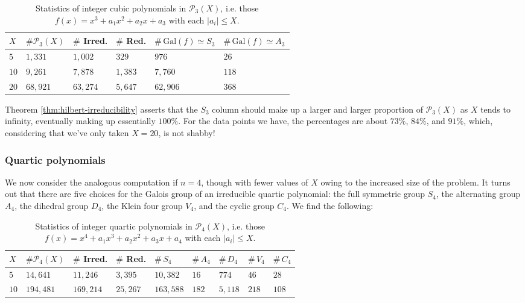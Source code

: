 \documentclass[12pt]{amsart}
\theoremstyle{definition} \newtheorem*{notation}{Notation}
\theoremstyle{remark} \newtheorem*{remark}{Remark}
\numberwithin{equation}{section}
\numberwithin{theorem}{section}
\begin{document}
	\begin{table}[h] \label{tbl:hilbert-cubic}
		\begin{tabular}{|l|l||l|l||l|l|}
			\hline $X$ & $\#\mathcal{P}_3(X)$ & $\#$ Irred. & $\#$ Red. & $\#\,\mathrm{Gal}(f) \simeq S_3$ & $\#\,\mathrm{Gal}(f) \simeq A_3$ \\ \hline
			$5$ & $1{,}331$ & $1{,}002$ & $329$ & $976$ & $26$ \\
			$10$ & $9{,}261$ & $7{,}878$ & $1{,}383$ & $7{,}760$ & $118$ \\
			$20$ & $68{,}921$ & $63{,}274$ & $5{,}647$ & $62{,}906$ & $368$ \\ \hline			
		\end{tabular}
		\caption{
			Statistics of integer cubic polynomials in $\mathcal{P}_3(X)$, i.e. those $f(x) = x^3 + a_1x^2 + a_2x + a_3$ with each $|a_i| \leq X$.
		}
	\end{table}
	
	Theorem \ref{thm:hilbert-irreducibility} asserts that the $S_3$ column should make up a larger and larger proportion of $\mathcal{P}_3(X)$ as $X$ tends to infinity, eventually making up essentially $100\%$.  For the data points we have, the percentages are about $73\%$, $84\%$, and $91\%$, which, considering that we've only taken $X=20$, is not shabby!
	
	\subsubsection{Quartic polynomials}  We now consider the analogous computation if $n=4$, though with fewer values of $X$ owing to the increased size of the problem.  It turns out that there are five choices for the Galois group of an irreducible quartic polynomial: the full symmetric group $S_4$, the alternating group $A_4$, the dihedral group $D_4$, the Klein four group $V_4$, and the cyclic group $C_4$.  We find the following:

	\begin{table}[h]
		\begin{tabular}{|l|l||l|l||l|l|l|l|l|}
			\hline $X$ & $\#\mathcal{P}_4(X)$ & $\#$ Irred. & $\#$ Red. & $\#\,S_4$ & $\#\,A_4$ & $\#\,D_4$ & $\#\,V_4$ & $\#\,C_4$ \\ \hline
			$5$ & $14{,}641$ & $11{,}246$ & $3{,}395$ & $10{,}382$ & $16$ & $774$ & $46$ & $28$ \\
			$10$ & $194{,}481$ & $169{,}214$ & $25{,}267$ & $163{,}588$ & $182$ & $5{,}118$ & $218$ & $108$ \\ \hline
		\end{tabular}
		\caption{
			Statistics of integer quartic polynomials in $\mathcal{P}_4(X)$, i.e. those $f(x) = x^4 + a_1x^3 + a_2x^2 + a_3x + a_4$ with each $|a_i| \leq X$.
		}
	\end{table}
\end{document}
